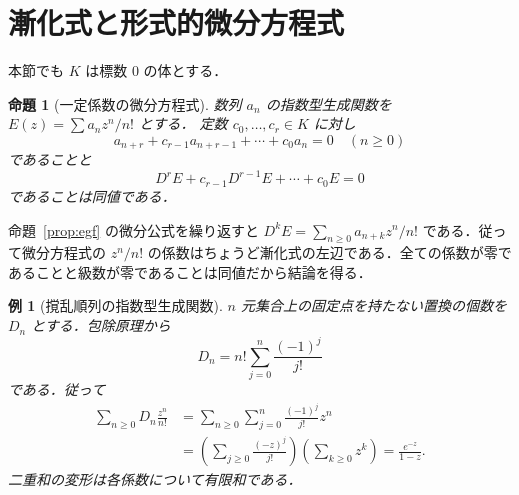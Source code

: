 \documentclass[a5paper,10pt,onecolumn]{jsarticle}
\makeatletter
\theoremstyle{mathnotetheorem}
\newtheorem{proposition}[theorem]{命題}
\newtheorem{example}[theorem]{例}
\renewcommand{\proofname}{証明}
\renewenvironment{proof}[1][\proofname]{%
  \par\pushQED{\qed}\normalfont\topsep4\p@\@plus2\p@\relax
  \trivlist\item[\hskip\labelsep\bfseries #1]\ignorespaces
}{\popQED\endtrivlist\@endpefalse}
\makeatother
\begin{document}
\section{漸化式と形式的微分方程式}
本節でも $K$ は標数 $0$ の体とする．
\begin{proposition}[一定係数の微分方程式]\label{prop:diff-eq}
数列 $a_n$ の指数型生成関数を $E(z)=\sum a_nz^n/n!$ とする．
定数 $c_0,\dots,c_r\in K$ に対し
\[
 a_{n+r}+c_{r-1}a_{n+r-1}+\cdots+c_0a_n=0\quad(n\ge0)
\]
であることと
\[
 D^rE+c_{r-1}D^{r-1}E+\cdots+c_0E=0
\]
であることは同値である．
\end{proposition}
\begin{proof}
命題~\ref{prop:egf} の微分公式を繰り返すと
$D^kE=\sum_{n\ge0}a_{n+k}z^n/n!$ である．従って微分方程式の $z^n/n!$ の係数はちょうど漸化式の左辺である．全ての係数が零であることと級数が零であることは同値だから結論を得る．
\end{proof}
\begin{example}[撹乱順列の指数型生成関数]
$n$ 元集合上の固定点を持たない置換の個数を $D_n$ とする．包除原理から
\[
 D_n=n!\sum_{j=0}^n\frac{(-1)^j}{j!}
\]
である．従って
\begin{align*}
 \sum_{n\ge0}D_n\frac{z^n}{n!}
 &=\sum_{n\ge0}\sum_{j=0}^n\frac{(-1)^j}{j!}z^n\\
 &=\left(\sum_{j\ge0}\frac{(-z)^j}{j!}\right)
   \left(\sum_{k\ge0}z^k\right)
 =\frac{e^{-z}}{1-z}.
\end{align*}
二重和の変形は各係数について有限和である．
\end{example}
\end{document}
